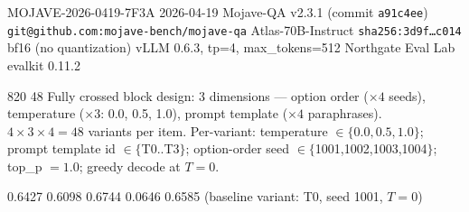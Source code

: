 
            {MOJAVE-2026-0419-7F3A}
       {2026-04-19}
    {Mojave-QA}
 {v2.3.1 \textnormal{(commit }\texttt{a91c4ee}\textnormal{)}}
  {\texttt{git@github.com:mojave-bench/mojave-qa}}
        {Atlas-70B-Instruct}
    {\texttt{sha256:3d9f\dots c014}}
       {bf16 (no quantization)}
     {vLLM 0.6.3, tp=4, max\_tokens=512}
     {Northgate Eval Lab}
    {evalkit 0.11.2}

           {820}
        {48}
    {Fully crossed block design: 3 dimensions ---
                           option order ($\times 4$ seeds),
                           temperature ($\times 3$: 0.0, 0.5, 1.0),
                           prompt template ($\times 4$ paraphrases).
                           $4\times3\times4 = 48$ variants per item.}
  {Per-variant: temperature $\in\{0.0,0.5,1.0\}$;
                           prompt template id $\in\{$T0..T3$\}$;
                           option-order seed $\in\{$1001,1002,1003,1004$\}$;
                           top\_p $=1.0$; greedy decode at $T{=}0$.}

       {0.6427}
      {0.6098}
      {0.6744}
      {0.0646}
      {0.6585 \textnormal{(baseline variant: T0, seed 1001, }$T{=}0$\textnormal{)}}

